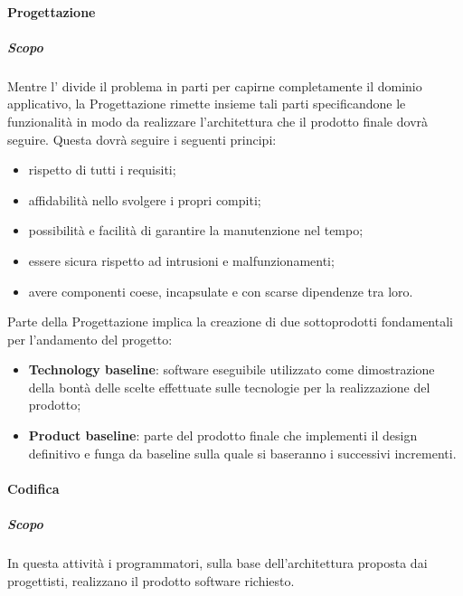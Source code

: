 		\paragraph{Progettazione}
   			\subparagraph{Scopo}
   			Mentre l' divide il problema in parti per capirne completamente il dominio applicativo, la Progettazione rimette insieme tali parti specificandone le funzionalità in modo da realizzare l'architettura che il prodotto finale dovrà seguire. Questa dovrà seguire i seguenti principi:
   			\begin{itemize}
   				\item rispetto di tutti i requisiti;
   				\item affidabilità nello svolgere i propri compiti;
   				\item possibilità e facilità di garantire la manutenzione nel tempo;
   				\item essere sicura rispetto ad intrusioni e malfunzionamenti;
   				\item avere componenti coese, incapsulate e con scarse dipendenze tra loro.
   			\end{itemize}
   			Parte della Progettazione implica la creazione di due sottoprodotti fondamentali per l'andamento del progetto:
   			\begin{itemize}
   				\item \textbf{Technology baseline}: software eseguibile utilizzato come dimostrazione della bontà delle scelte effettuate sulle tecnologie per la realizzazione del prodotto;
   				\item \textbf{Product baseline}: parte del prodotto finale che implementi il design definitivo e funga da baseline sulla quale si baseranno i successivi incrementi.
            \end{itemize}

		\paragraph{Codifica}
   			\subparagraph{Scopo}
   			In questa attività i programmatori, sulla base dell'architettura proposta dai progettisti, realizzano il prodotto software richiesto.

